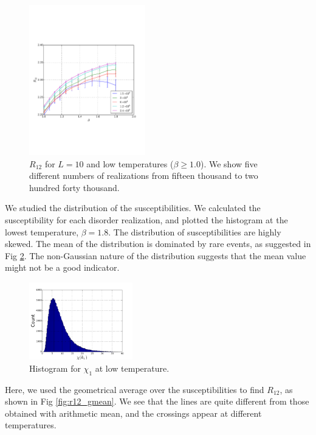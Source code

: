 \documentclass[aps,prb,twocolumn,showpacs,superscriptaddress]{revtex4}
\begin{document}
\begin{figure}[ht]
  \includegraphics[width=0.45\textwidth]{img/R12_l10_samples.pdf}
  \caption{$R_{12}$ for $L=10$ and low temperatures ($\beta \geq 1.0$). We show five different numbers of 
realizations from fifteen thousand to two hundred forty thousand.}
\label{fig:R12_l10_samples}
\end{figure}


We studied the distribution of the susceptibilities. We calculated the susceptibility
for each disorder realization, and plotted the histogram at the lowest temperature,
$\beta=1.8$.
The distribution of susceptibilities are highly skewed. 
The mean of the distribution is dominated by rare
events, as suggested in Fig \ref{fig:hist_chi}. 
The non-Gaussian nature of the distribution suggests that the mean value might 
not be a good indicator. 


\begin{figure}[ht]
  \centering
  \includegraphics[width=0.4\textwidth]{img/chi_1_dist.pdf}
  \caption{Histogram for $\chi_1$ at low temperature.}
\label{fig:hist_chi}
\end{figure}

Here, we used the geometrical average \cite{PhysRevB.88.134204} over the susceptibilities to find $R_{12}$,
as shown in Fig \ref{fig:r12_gmean}.
We see that the lines are quite different from those obtained with arithmetic 
mean, and the crossings appear at different temperatures. 
\end{document}
